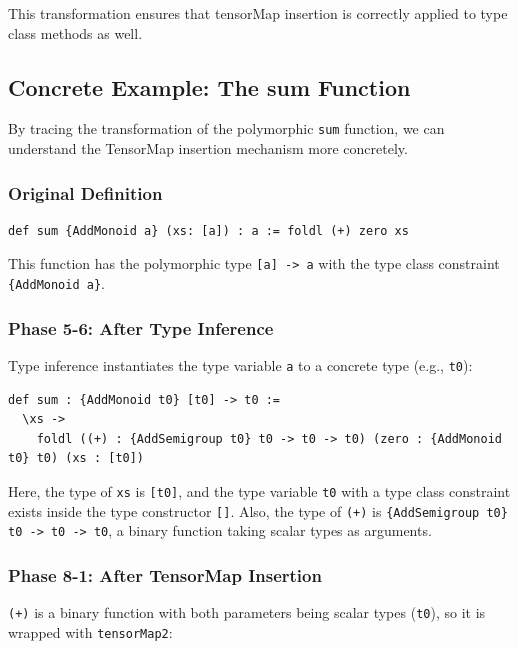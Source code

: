 This transformation ensures that tensorMap insertion is correctly applied to type class methods as well.

\subsection{Concrete Example: The sum Function}

By tracing the transformation of the polymorphic \lstinline{sum} function, we can understand the TensorMap insertion mechanism more concretely.

\subsubsection{Original Definition}

\begin{lstlisting}[language=egison,numbers=none]
def sum {AddMonoid a} (xs: [a]) : a := foldl (+) zero xs
\end{lstlisting}

This function has the polymorphic type \lstinline{[a] -> a} with the type class constraint \lstinline|{AddMonoid a}|.

\subsubsection{Phase 5-6: After Type Inference}

Type inference instantiates the type variable \lstinline{a} to a concrete type (e.g., \lstinline{t0}):

\begin{lstlisting}[language=egison,numbers=none]
def sum : {AddMonoid t0} [t0] -> t0 :=
  \xs ->
    foldl ((+) : {AddSemigroup t0} t0 -> t0 -> t0) (zero : {AddMonoid t0} t0) (xs : [t0])
\end{lstlisting}

Here, the type of \lstinline{xs} is \lstinline{[t0]}, and the type variable \lstinline{t0} with a type class constraint exists inside the type constructor \lstinline{[]}.
Also, the type of \lstinline{(+)} is \lstinline|{AddSemigroup t0} t0 -> t0 -> t0|, a binary function taking scalar types as arguments.

\subsubsection{Phase 8-1: After TensorMap Insertion}

\lstinline{(+)} is a binary function with both parameters being scalar types (\lstinline{t0}), so it is wrapped with \lstinline{tensorMap2}:

